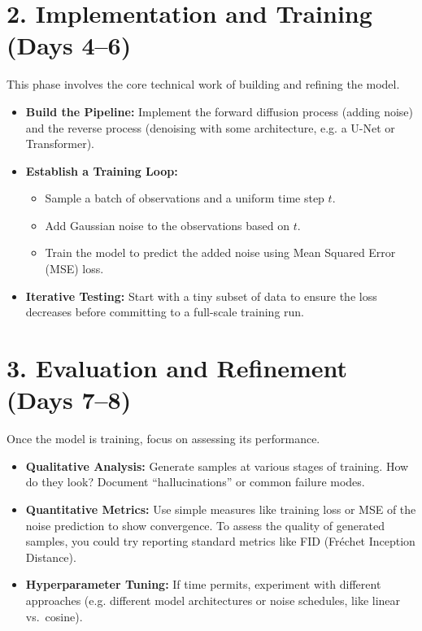 \documentclass[letterpaper]{inzane_syllabus} %
\begin{document}
\section{2. Implementation and Training (Days 4--6)}
This phase involves the core technical work of building and refining the model.  
\begin{itemize}

    \item \textbf{Build the Pipeline:} Implement the forward diffusion process (adding noise) and the reverse process (denoising with some architecture, e.g. a U-Net or Transformer).
    \item \textbf{Establish a Training Loop:}
    \begin{itemize}
        \item Sample a batch of observations and a uniform time step $t$.
        \item Add Gaussian noise to the observations based on $t$.
        \item Train the model to predict the added noise using Mean Squared Error (MSE) loss.
    \end{itemize}
    \item \textbf{Iterative Testing:} Start with a tiny subset of data to ensure the loss decreases before committing to a full-scale training run.
\end{itemize}

\section{3. Evaluation and Refinement (Days 7--8)}
Once the model is training, focus on assessing its performance.
\begin{itemize}
    \item \textbf{Qualitative Analysis:} Generate samples at various stages of training.  How do they look? Document ``hallucinations'' or common failure modes.
    \item \textbf{Quantitative Metrics:} Use simple measures like training loss or MSE of the noise prediction to show convergence. To assess the quality of generated samples, you could try reporting standard metrics like FID (Fr\'echet Inception Distance).
    \item \textbf{Hyperparameter Tuning:} If time permits, experiment with different approaches (e.g. different model architectures or noise schedules, like linear vs.\ cosine).
\end{itemize}
\end{document}
